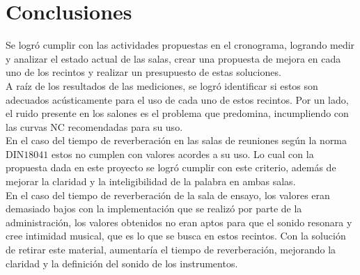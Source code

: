 \section{Conclusiones}
Se logró cumplir con las actividades propuestas en el cronograma, logrando medir y analizar el estado actual de las
salas, crear una propuesta de mejora en cada uno de los recintos y realizar un presupuesto de estas soluciones.\\
A raíz de los resultados de las mediciones, se logró identificar si estos son adecuados acústicamente para el uso 
de cada uno de estos recintos. Por un lado, el ruido presente en los salones es el problema que predomina, 
incumpliendo con las curvas NC recomendadas para su uso.\\
En el caso del tiempo de reverberación en las salas de reuniones según la norma DIN$18041$ estos no cumplen con 
valores acordes a su uso. Lo cual con la propuesta dada en este proyecto se logró cumplir con este criterio, además
de mejorar la claridad y la inteligibilidad de la palabra en ambas salas.\\
En el caso del tiempo de reverberación de la sala de ensayo, los valores eran demasiado bajos con la implementación
que se realizó por parte de la administración, los valores obtenidos no eran aptos para que el sonido resonara y 
cree intimidad musical, que es lo que se busca en estos recintos. Con la solución de retirar este material, 
aumentaría el tiempo de reverberación, mejorando la claridad y la definición del sonido de los instrumentos.\\
